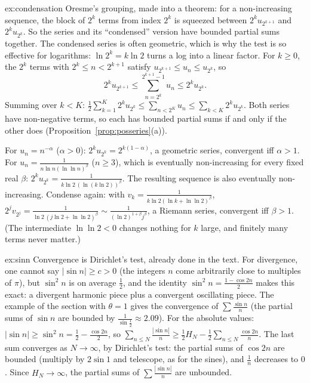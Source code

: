 \begin{solution}{ex:condensation}
\idea Oresme's grouping, made into a theorem: for a non-increasing sequence, the block of $2^k$ terms from index $2^k$ is squeezed between $2^ku_{2^{k+1}}$ and $2^ku_{2^k}$. So the series and its ``condensed'' version have bounded partial sums together. The condensed series is often geometric, which is why the test is so effective for logarithms: $\ln2^k=k\ln2$ turns a log into a linear factor.
\writeup For $k\ge0$, the $2^k$ terms with $2^k\le n<2^{k+1}$ satisfy $u_{2^{k+1}}\le u_n\le u_{2^k}$, so
\[
2^ku_{2^{k+1}}\le\sum_{n=2^k}^{2^{k+1}-1}u_n\le2^ku_{2^k}.
\]
Summing over $k<K$: $\frac12\sum_{k=1}^{K}2^ku_{2^k}\le\sum_{n<2^K}u_n\le\sum_{k<K}2^ku_{2^k}$. Both series have non-negative terms, so each has bounded partial sums if and only if the other does (Proposition~\ref{prop:posseries}(a)).

For $u_n=n^{-\alpha}$ ($\alpha>0$): $2^ku_{2^k}=2^{k(1-\alpha)}$, a geometric series, convergent iff $\alpha>1$.
For $u_n=\frac1{n\ln n(\ln\ln n)^\beta}$ ($n\ge3$), which is eventually non-increasing for every fixed real $\beta$: $2^ku_{2^k}=\frac1{k\ln2\,(\ln(k\ln2))^\beta}$. The resulting sequence is also eventually non-increasing. Condense again: with $v_k=\frac1{k\ln2(\ln k+\ln\ln2)^\beta}$, $2^jv_{2^j}=\frac1{\ln2\,(j\ln2+\ln\ln2)^\beta}\sim\frac{1}{(\ln2)^{1+\beta}j^\beta}$, a Riemann series, convergent iff $\beta>1$. (The intermediate $\ln\ln2<0$ changes nothing for $k$ large, and finitely many terms never matter.)
\end{solution}

\begin{solution}{ex:sinn}
\idea Convergence is Dirichlet's test, already done in the text. For divergence, one cannot say $|\sin n|\ge c>0$ (the integers $n$ come arbitrarily close to multiples of $\pi$), but $\sin^2n$ is on average $\frac12$, and the identity $\sin^2n=\frac{1-\cos2n}2$ makes this exact: a divergent harmonic piece plus a convergent oscillating piece.
\writeup The example of the section with $\theta=1$ gives the convergence of $\sum\frac{\sin n}n$ (the partial sums of $\sin n$ are bounded by $\frac1{\sin\frac12}\approx2.09$).
For the absolute values: $|\sin n|\ge\sin^2n=\frac12-\frac{\cos2n}2$, so $\sum_{n\le N}\frac{|\sin n|}n\ge\frac12H_N-\frac12\sum_{n\le N}\frac{\cos2n}n$. The last sum converges as $N\to\infty$, by Dirichlet's test: the partial sums of $\cos2n$ are bounded (multiply by $2\sin1$ and telescope, as for the sines), and $\frac1n$ decreases to $0$. Since $H_N\to\infty$, the partial sums of $\sum\frac{|\sin n|}n$ are unbounded.
\end{solution}

